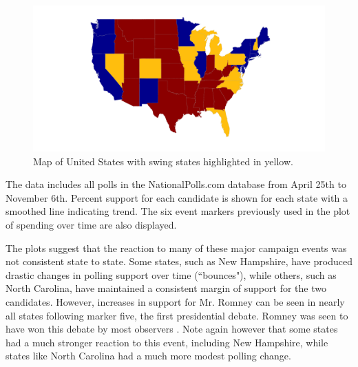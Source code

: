 \documentclass[11pt]{article}\usepackage{graphicx, color}
\newenvironment{knitrout}{}{} %
\begin{document}
\begin{knitrout}
\color{fgcolor}\begin{figure}[H]


{\centering \includegraphics[width=\textwidth]{figure/swing_map} 

}

\caption[Map of United States with swing states highlighted in yellow]{Map of United States with swing states highlighted in yellow.\label{fig:swing_map}}
\end{figure}


\end{knitrout}


The data includes all polls in the NationalPolls.com database from April 25th to November 6th. Percent support for each candidate is shown for each state with a smoothed line indicating trend. The six event markers previously used in the plot of spending over time are also displayed.

The plots suggest that the reaction to many of these major campaign events was not consistent state to state. Some states, such as New Hampshire, have produced drastic changes in polling support over time (``bounces"), while others, such as North Carolina, have maintained a consistent margin of support for the two candidates. However, increases in support for Mr. Romney can be seen in nearly all states following marker five, the first presidential debate. Romney was seen to have won this debate by most observers \cite{jj-debate}. Note again however that some states had a much stronger reaction to this event, including New Hampshire, while states like North Carolina had a much more modest polling change.
\end{document}
